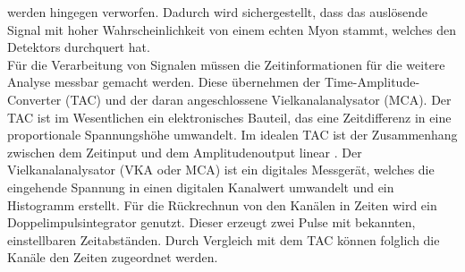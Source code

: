 werden hingegen verworfen. Dadurch wird sichergestellt, dass das auslösende 
Signal mit hoher Wahrscheinlichkeit von einem echten Myon stammt, welches den 
Detektors durchquert hat. \\
Für die Verarbeitung von Signalen müssen die Zeitinformationen für die weitere 
Analyse messbar gemacht werden. Diese übernehmen der Time-Amplitude-Converter 
(TAC) und der daran angeschlossene Vielkanalanalysator (MCA).
Der TAC ist im Wesentlichen ein elektronisches Bauteil, das eine Zeitdifferenz
in eine proportionale Spannungshöhe umwandelt. Im idealen TAC ist der Zusammenhang
zwischen dem Zeitinput und dem Amplitudenoutput linear \cite{tac}. Der 
Vielkanalanalysator (VKA oder MCA) ist ein digitales Messgerät, welches die 
eingehende Spannung in einen digitalen Kanalwert umwandelt und ein Histogramm 
erstellt. Für die Rückrechnun von den Kanälen in Zeiten wird ein 
Doppelimpulsintegrator genutzt. Dieser erzeugt zwei Pulse mit bekannten, 
einstellbaren Zeitabständen. Durch Vergleich mit dem TAC können folglich die 
Kanäle den Zeiten zugeordnet werden.


